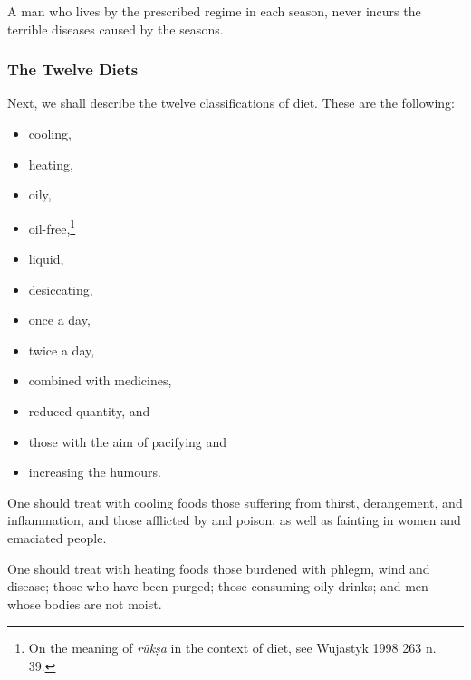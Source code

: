 \begin{translation}
\item[75]
A man who lives by the prescribed regime in each season, %
never %
incurs the terrible diseases caused by the seasons.

\subsubsection{The Twelve Diets}

\item[76] %
Next, %
we shall describe the twelve classifications of diet. %
These are the following: %
\begin{itemize}
\item cooling, %
\item heating, 
\item oily, 
\item oil-free,\footnote{
    On the meaning of \emph{rūkṣa} in the context of diet, see  Wujastyk 1998 263 n. 39.
} 
\item liquid, 
\item desiccating, %
\item once a day, %
\item twice a day, %
\item combined with medicines, %
\item reduced-quantity, %
and \item those with the aim of pacifying and %
\item increasing the humours. %
\end{itemize}

\item[77]
One should treat with cooling foods %
those suffering from thirst, derangement, %
and inflammation, and %
those afflicted by  %
and poison,
as well as fainting in women and emaciated people. %

\item[78] %
One should treat with heating foods %
those burdened with%
phlegm, wind and disease;
those who have been purged; %
those consuming oily drinks; %
and men whose bodies are not moist. %


\end{translation}
